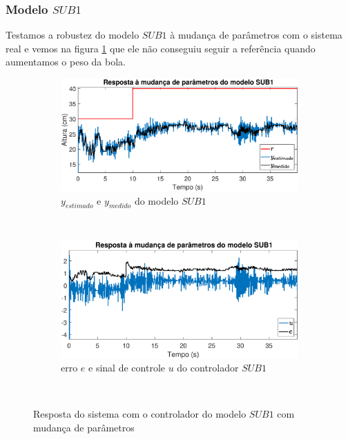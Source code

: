 \subsubsection{Modelo $SUB1$}
Testamos a robustez do modelo $SUB1$ à mudança de parâmetros com o sistema real e vemos na figura \ref{fig:mprsub1y} que ele não conseguiu seguir a referência quando aumentamos o peso da bola.
\begin{figure}[htb]
	\centering
	\begin{subfigure}[t]{0.48\textwidth}
		\includegraphics[width=1\linewidth]{mprsub1y}
		\caption[$y_{estimado}$ e $y_{medido}$ do modelo $SUB1$]{$y_{estimado}$ e $y_{medido}$ do modelo $SUB1$}
		\label{fig:mprsub1y}
	\end{subfigure}
	~ %
	\begin{subfigure}[t]{0.48\textwidth}
		\includegraphics[width=1\linewidth]{mprsub1e}
		\caption[erro $e$ e sinal de controle $u$ do controlador $SUB1$]{erro $e$ e sinal de controle $u$ do controlador $SUB1$}
		\label{fig:mprsub1e}
	\end{subfigure}
	~ %
	
	\caption{Resposta do sistema com o controlador do modelo $SUB1$ com mudança de parâmetros}\label{fig:mprsub1}
\end{figure}

